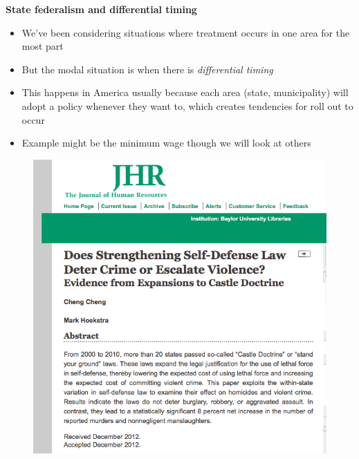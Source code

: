 \documentclass[notes=show]{beamer}
\begin{document}
\begin{frame}[plain]
\begin{center}
\textbf{State federalism and differential timing}
\end{center}

\begin{itemize}
\item We've been considering situations where treatment occurs in one area for the most part
\item But the modal situation is when there is \emph{differential timing}
\item This happens in America usually because each area (state, municipality) will adopt a policy whenever they want to, which creates tendencies for roll out to occur
\item Example might be the minimum wage though we will look at others
\end{itemize}

\end{frame}



\begin{frame}[plain]
	\begin{figure}
	\includegraphics[scale=0.5]{./lecture_includes/cheng_and_hoekstra_jhr.png}
	\end{figure}

\end{frame}
\end{document}
